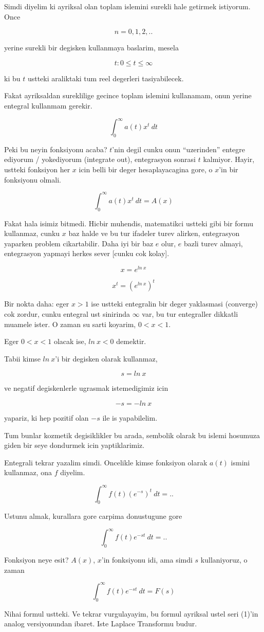 \documentclass[12pt,fleqn]{article}
\begin{document}
Simdi diyelim ki ayriksal olan toplam islemini surekli hale getirmek
istiyorum. Once

\[ n = 0,1,2,.. \]

yerine surekli bir degisken kullanmaya baslarim, mesela

\[ t: 0 \le t \le \infty \]

ki bu $t$ ustteki araliktaki tum reel degerleri tasiyabilecek. 

Fakat ayriksaldan sureklilige gecince toplam islemini kullanamam, onun
yerine entegral kullanmam gerekir. 

\[ \int_0^{\infty} a(t)x^t \ dt \]

Peki bu neyin fonksiyonu acaba? $t$'nin degil cunku onun ``uzerinden''
entegre ediyorum / yokediyorum (integrate out), entegrasyon sonrasi $t$
kalmiyor. Hayir, ustteki fonksiyon her $x$ icin belli bir deger
hesaplayacagina gore, o $x$'in bir fonksiyonu olmali. 

\[ \int_0^{\infty} a(t)x^t \ dt = A(x)\]

Fakat hala isimiz bitmedi. Hicbir muhendis, matematikci ustteki gibi bir
formu kullanmaz, cunku $x$ baz halde ve bu tur ifadeler turev alirken,
entegrasyon yaparken problem cikartabilir. Daha iyi bir baz $e$ olur, $e$
bazli turev almayi, entegrasyon yapmayi herkes sever [cunku cok kolay]. 

\[ x = e^{ln \ x} \]

\[ x^t = (e^{ln \ x})^t \]

Bir nokta daha: eger $x > 1$ ise ustteki entegralin bir deger yaklasmasi
(converge) cok zordur, cunku entegral ust sinirinda $\infty$ var, bu tur
entegraller dikkatli muamele ister. O zaman su sarti koyarim, $0 < x < 1$. 

Eger  $0 < x < 1$ olacak ise, $ln \ x < 0$ demektir. 

Tabii kimse $ln \ x$'i bir degisken olarak kullanmaz, 

\[ s = ln \ x \]

ve negatif degiskenlerle ugrasmak istemedigimiz icin 

\[ -s = -ln \ x \] 

yapariz, ki hep pozitif olan $-s$ ile is yapabilelim. 

Tum bunlar kozmetik degisiklikler bu arada, sembolik olarak bu islemi
hosumuza giden bir seye dondurmek icin yaptiklarimiz. 

Entegrali tekrar yazalim simdi. Oncelikle kimse fonksiyon olarak $a(t)$
ismini kullanmaz, ona $f$ diyelim. 

\[ \int_0^{\infty} f(t)(e^{-s})^t \ dt = ..\]

Ustunu almak, kurallara gore carpima donustugune gore

\[ \int_0^{\infty} f(t)e^{-st} \ dt = ..\]

Fonksiyon neye esit? $A(x)$, $x$'in fonksiyonu idi, ama simdi $s$
kullaniyoruz, o zaman 

\[ \int_0^{\infty} f(t)e^{-st} \ dt = F(s)\]

Nihai formul ustteki. Ve tekrar vurgulayayim, bu formul ayriksal ustel seri
(1)'in analog versiyonundan ibaret. Iste Laplace Transformu budur. 
\end{document}
